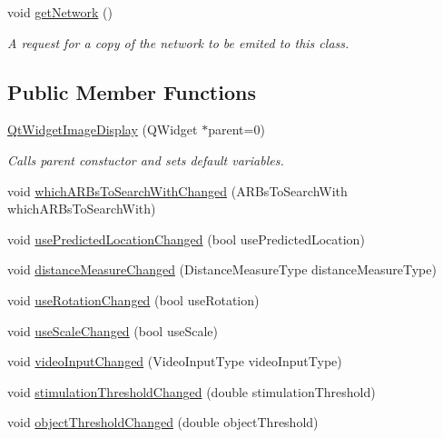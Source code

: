 \begin{DoxyCompactItemize}
\item 
\hypertarget{class_qt_widget_image_display_aaaf8f08ea03050bbee5aea48c3161e9f}{}void \hyperlink{class_qt_widget_image_display_aaaf8f08ea03050bbee5aea48c3161e9f}{get\+Network} ()\label{class_qt_widget_image_display_aaaf8f08ea03050bbee5aea48c3161e9f}

\begin{DoxyCompactList}\small\item\em A request for a copy of the network to be emited to this class. \end{DoxyCompactList}\end{DoxyCompactItemize}
\subsection*{Public Member Functions}
\begin{DoxyCompactItemize}
\item 
\hyperlink{class_qt_widget_image_display_a9ea3610dc3cae789d500b4f53cdb56b2}{Qt\+Widget\+Image\+Display} (Q\+Widget $\ast$parent=0)
\begin{DoxyCompactList}\small\item\em Calls parent constuctor and sets default variables. \end{DoxyCompactList}\item 
void \hyperlink{class_qt_widget_image_display_a26454c4394b3ae3bc9cb430f1107b27f}{which\+A\+R\+Bs\+To\+Search\+With\+Changed} (A\+R\+Bs\+To\+Search\+With which\+A\+R\+Bs\+To\+Search\+With)
\item 
void \hyperlink{class_qt_widget_image_display_ad8ff14b5736c02451e9671049377f804}{use\+Predicted\+Location\+Changed} (bool use\+Predicted\+Location)
\item 
void \hyperlink{class_qt_widget_image_display_a0ffc0b84135973ba32c75e2b42d9bb14}{distance\+Measure\+Changed} (Distance\+Measure\+Type distance\+Measure\+Type)
\item 
void \hyperlink{class_qt_widget_image_display_ab17105b0117339be323f990ff8089045}{use\+Rotation\+Changed} (bool use\+Rotation)
\item 
void \hyperlink{class_qt_widget_image_display_af598a9cee6959fcac05e8574bb2829ef}{use\+Scale\+Changed} (bool use\+Scale)
\item 
void \hyperlink{class_qt_widget_image_display_ab8581f2118716a98efda55054ab8b38c}{video\+Input\+Changed} (Video\+Input\+Type video\+Input\+Type)
\item 
void \hyperlink{class_qt_widget_image_display_a25b3298891cc5f2c085eadee653bb997}{stimulation\+Threshold\+Changed} (double stimulation\+Threshold)
\item 
void \hyperlink{class_qt_widget_image_display_a2fa5da388332212c0eff72bdc6ce0131}{object\+Threshold\+Changed} (double object\+Threshold)
\end{DoxyCompactItemize}
